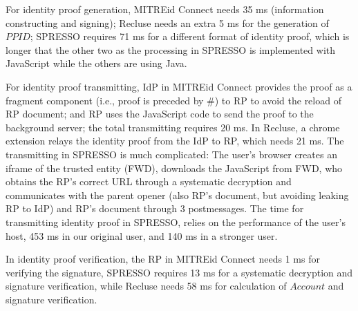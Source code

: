 For identity proof generation, MITREid Connect needs 35 ms (information constructing and signing); Recluse needs an extra 5 ms for the generation of $PPID$;  SPRESSO requires 71 ms for a different format of identity proof, which is longer that the other two as the processing in SPRESSO is implemented with JavaScript while the others are using Java.

For identity proof transmitting, IdP in  MITREid Connect provides the proof as a fragment component (i.e., proof is preceded by \#) to RP to avoid the reload of RP document; and RP uses the JavaScript code to send the proof to the background server; the total transmitting requires 20 ms. In Recluse, a chrome extension relays the identity proof from the IdP to RP, which needs 21 ms. The transmitting in SPRESSO is much complicated: The user's browser creates an iframe of the trusted entity (FWD), downloads the JavaScript from FWD, who obtains the RP's correct URL through a systematic decryption and communicates with the parent opener (also RP's document, but avoiding leaking RP to IdP) and RP's document through 3 postmessages. The time for transmitting identity proof in SPRESSO, relies on the performance of the user's host, 453 ms in our original user, and 140 ms in a stronger user.

In identity proof verification, the RP in MITREid Connect needs 1 ms for verifying the signature, SPRESSO requires 13 ms for a systematic decryption and signature verification, while Recluse needs 58 ms for calculation of $Account$ and signature verification.


